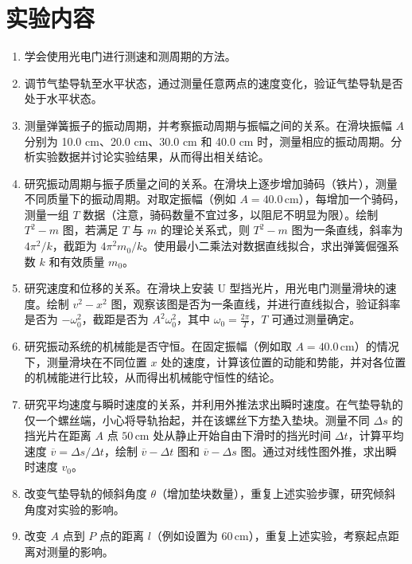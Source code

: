 \documentclass[UTF-8,twoside,cs4size]{ctexart}
\begin{document}
\section{实验内容}
\begin{enumerate}
    \item 学会使用光电门进行测速和测周期的方法。
    
    \item 调节气垫导轨至水平状态，通过测量任意两点的速度变化，验证气垫导轨是否处于水平状态。

    \item 测量弹簧振子的振动周期，并考察振动周期与振幅之间的关系。在滑块振幅 $A$ 分别为 10.0 cm、20.0 cm、30.0 cm 和 40.0 cm 时，测量相应的振动周期。分析实验数据并讨论实验结果，从而得出相关结论。

    \item 研究振动周期与振子质量之间的关系。在滑块上逐步增加骑码（铁片），测量不同质量下的振动周期。对取定振幅（例如 $A = 40.0 \, \mathrm{cm}$），每增加一个骑码，测量一组 $T$ 数据（注意，骑码数量不宜过多，以阻尼不明显为限）。绘制 $T^2-m$ 图，若满足 $T$ 与 $m$ 的理论关系式，则 $T^2-m$ 图为一条直线，斜率为 $4\pi^2 / k$，截距为 $4\pi^2 m_0 / k$。使用最小二乘法对数据直线拟合，求出弹簧倔强系数 $k$ 和有效质量 $m_0$。

    \item 研究速度和位移的关系。在滑块上安装 U 型挡光片，用光电门测量滑块的速度。绘制 $v^2-x^2$ 图，观察该图是否为一条直线，并进行直线拟合，验证斜率是否为 $-\omega_0^2$，截距是否为 $A^2 \omega_0^2$，其中 $\omega_0 = \frac{2\pi}{T}$，$T$ 可通过测量确定。

    \item 研究振动系统的机械能是否守恒。在固定振幅（例如取 $A = 40.0 \, \mathrm{cm}$）的情况下，测量滑块在不同位置 $x$ 处的速度，计算该位置的动能和势能，并对各位置的机械能进行比较，从而得出机械能守恒性的结论。

    \item 研究平均速度与瞬时速度的关系，并利用外推法求出瞬时速度。在气垫导轨的仅一个螺丝端，小心将导轨抬起，并在该螺丝下方垫入垫块。测量不同 $\Delta s$ 的挡光片在距离 $A$ 点 $50 \, \mathrm{cm}$ 处从静止开始自由下滑时的挡光时间 $\Delta t$，计算平均速度 $\overline{v} = \Delta s / \Delta t$，绘制 $\overline{v}-\Delta t$ 图和 $\overline{v}-\Delta s$ 图。通过对线性图外推，求出瞬时速度 $v_0$。

    \item 改变气垫导轨的倾斜角度 $\theta$（增加垫块数量），重复上述实验步骤，研究倾斜角度对实验的影响。

    \item 改变 $A$ 点到 $P$ 点的距离 $l$（例如设置为 $60 \, \mathrm{cm}$），重复上述实验，考察起点距离对测量的影响。
\end{enumerate}
\end{document}
